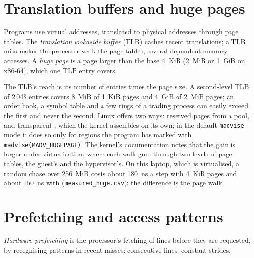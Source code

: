 \section{Translation buffers and huge pages}

\begin{definition}\label{def:ll:memory-hierarchy-and-caches:tlb}
Programs use virtual addresses, translated to physical addresses through page tables. The \emph{translation lookaside
buffer} (TLB) caches recent translations; a TLB miss makes the processor walk the
page tables, several dependent memory accesses. A \emph{huge page} is a page larger than the base
4~KiB (2~MiB or 1~GiB on x86-64), which one TLB entry covers.
\end{definition}

The TLB's reach is its number of entries times the page size. A second-level TLB of 2\,048 entries covers 8~MiB of
4~KiB pages and 4~GiB of 2~MiB pages; an order book, a symbol table and a few rings of a trading process can easily
exceed the first and never the second. Linux offers  two ways: reserved pages from a pool, and transparent
, which the kernel assembles on its own; in the default \texttt{madvise} mode it does so only for regions the
program has marked with \texttt{madvise(MADV\_HUGEPAGE)}. The kernel's documentation notes that the gain is larger
under virtualisation, where each walk goes through two levels of page tables, the guest's and the hypervisor's. On
this laptop, which is virtualised, a random chase over 256~MiB costs about \qty{180}{\nano\second} a step with 4~KiB
pages and about \qty{150}{\nano\second} with  (\texttt{measured\_huge.csv}): the difference is
the page walk.


\section{Prefetching and access patterns}

\begin{definition}\label{def:ll:memory-hierarchy-and-caches:prefetch}
\emph{Hardware prefetching} is the processor's fetching of lines before they are requested,
by recognising patterns in recent misses: consecutive lines, constant strides.
\end{definition}

